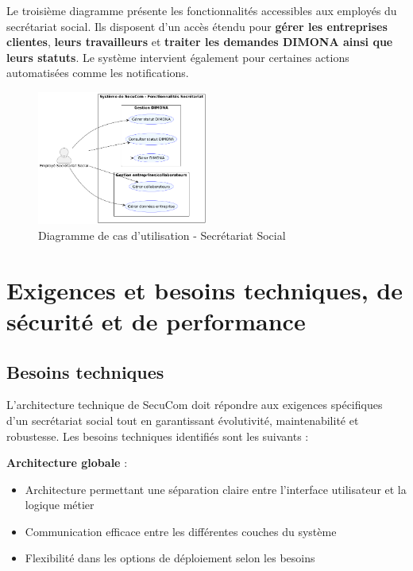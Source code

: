 \noindent Le troisième diagramme présente les fonctionnalités accessibles aux employés du secrétariat social. Ils disposent d'un accès étendu pour \textbf{gérer les entreprises clientes}, \textbf{leurs travailleurs} et \textbf{traiter les demandes DIMONA ainsi que leurs statuts}. Le système intervient également pour certaines actions automatisées comme les notifications.

\vspace{0.5cm}
\begin{figure}[h]
\centering
\includegraphics[width=0.5\textwidth]{SecretariatUC.png}
\caption{Diagramme de cas d'utilisation - Secrétariat Social}
\end{figure}

\section{Exigences et besoins techniques, de sécurité et de performance}

\subsection{Besoins techniques}

L'architecture technique de SecuCom doit répondre aux exigences spécifiques d'un secrétariat social tout en garantissant évolutivité, maintenabilité et robustesse. Les besoins techniques identifiés sont les suivants :

\vspace{0.5cm}
\textbf{Architecture globale} :
\begin{itemize}[leftmargin=*,label=\textcolor{darkgray}{$\bullet$},itemsep=0.3em]
  \item Architecture permettant une séparation claire entre l'interface utilisateur et la logique métier
  \item Communication efficace entre les différentes couches du système
  \item Flexibilité dans les options de déploiement selon les besoins
\end{itemize}


